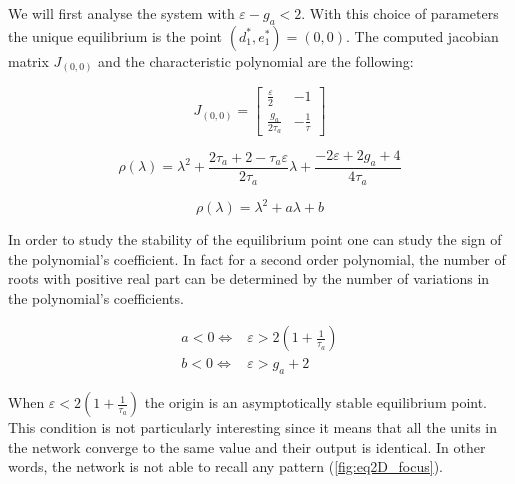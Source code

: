 We will first analyse the system with $\varepsilon - g_a < 2$. With this choice of parameters the unique equilibrium is the point $(d_1^*,e_1^*)=(0, 0)$. The computed jacobian matrix $J_{(0,0)}$ and the characteristic polynomial are the following:

\begin{equation}
J_{(0, 0)} = \begin{bmatrix} 
\frac{\varepsilon}{2} & -1 \\
\frac{g_a}{2\tau_a} & -\frac{1}{\tau}
\end{bmatrix}
\end{equation}

\begin{equation}
\rho(\lambda) = \lambda^2 +  \frac{2\tau_a + 2 - \tau_a \varepsilon}{2\tau_a} \lambda + \frac{-2\varepsilon + 2g_a + 4}{4\tau_a}
\end{equation}

\begin{equation}
\rho(\lambda) = \lambda^2 + a\lambda +b
\end{equation}

In order to study the stability of the equilibrium point one can study the sign of the polynomial's coefficient. In fact for a second order polynomial, the number of roots with positive real part can be determined by the number of variations in the polynomial's coefficients.

\begin{equation}
\begin{aligned}
 a < 0 \iff & \varepsilon > 2(1 + \frac{1}{\tau_a}) \\
 b < 0 \iff & \varepsilon > g_a + 2
\end{aligned}
\end{equation}

When $\varepsilon<2(1+\frac{1}{\tau_a})$ the origin is an asymptotically stable equilibrium point. This condition is not particularly interesting since it means that all the units in the network converge to the same value and their output is identical. In other words, the network is not able to recall any pattern (\cref{fig:eq2D_focus}).

